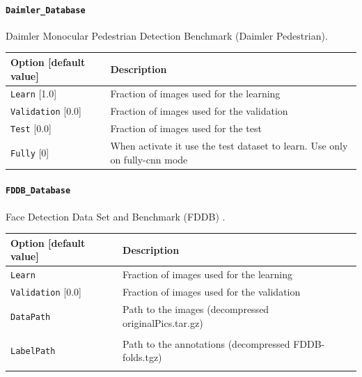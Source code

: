 \documentclass[a4paper,11pt,oneside]{article}
\begin{document}
\paragraph{\texorpdfstring{%
\lstinline[basicstyle=\ttfamily\bfseries]!Daimler_Database!}{Daimler\_Database}}
Daimler Monocular Pedestrian Detection Benchmark (Daimler Pedestrian).

\begin{center}
 \begin{tabular}{| p{5cm} | p{10cm} | }
 \hline
 Option [default value] & Description\\
 \hline\hline
  \cellcolor{requiredcolor}
  \lstinline!Learn! [1.0] & Fraction of images used for the learning \\
  \lstinline!Validation! [0.0] & Fraction of images used for the validation \\
  \lstinline!Test! [0.0] & Fraction of images used for the test \\
  \lstinline!Fully! [0] & When activate it use the test dataset to learn.
  Use only on fully-cnn mode\\
 \hline
\end{tabular}
\end{center}

\paragraph{\texorpdfstring{%
\lstinline[basicstyle=\ttfamily\bfseries]!FDDB_Database!}{FDDB\_Database}}
Face Detection Data Set and Benchmark (FDDB) \citep{Jain2010}.

\begin{center}
 \begin{tabular}{| p{5cm} | p{10cm} | }
 \hline
 Option [default value] & Description\\
 \hline\hline
  \cellcolor{requiredcolor}
  \lstinline!Learn! & Fraction of images used for the learning \\
  \lstinline!Validation! [0.0] & Fraction of images used for the validation \\
  \lstinline!DataPath! & Path to the images
  (decompressed originalPics.tar.gz) \\
   & \\
  \lstinline!LabelPath! & Path to the annotations
  (decompressed FDDB-folds.tgz) \\
  \noindent [\lstinline!$N2D2_DATA!/FDDB] & \\
 \hline
\end{tabular}
\end{center}
\end{document}

